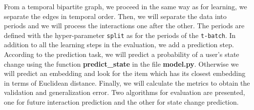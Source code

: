 From a temporal bipartite graph, we proceed in the same way as for learning, we separate the edges in temporal order. Then, we will separate the data into periods and we will process the interactions one after the other. The periods are defined with the hyper-parameter \texttt{split} as for the periods of the \texttt{t-batch}. In addition to all the learning steps in the evaluation, we add a prediction step. According to the prediction task, we will predict a probability of a user's state change using the function \textbf{predict\_state} in the file \textbf{model.py}. Otherwise we will predict an embedding and look for the item which has its closest embedding in terms of Euclidean distance. Finally, we will calculate the metrics to obtain the validation and generalization error. Two algorithms for evaluation are presented, one for future interaction prediction and the other for state change prediction.

